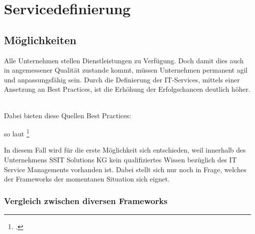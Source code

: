 \chapter{Servicedefinierung}
\label{chap: Servicedefinierung}

\section{Möglichkeiten}
\label{chap: Möglichkeiten zur Servicedefinierung}

Alle Unternehmen stellen Dienstleistungen zu Verfügung. Doch damit dies auch in angemessener Qualität zustande kommt, 
müssen Unternehmen permanent agil und anpassungsfähig sein. Durch die Definierung der IT-Services, mittels einer Ansetzung an Best Practices, 
ist die Erhöhung der Erfolgschancen deutlich höher.
\

Dabei bieten diese Quellen Best Practices:

\begin{quote}
\end{quote}

so laut \footcite[][Kap.\ 1.1]{ITIL}

\noindent
\newline
In diesem Fall wird für die erste Möglichkeit sich entschieden,
weil innerhalb des Unternehmens SSIT Solutions KG kein qualifiziertes
 Wissen bezüglich des IT Service Managements vorhanden ist.
 Dabei stellt sich nur noch in Frage, welches der Frameworks der momentanen Situation
 sich eignet.

\subsection{Vergleich zwischen diversen Frameworks}
\label{chap: Vergleich Frameworks}

